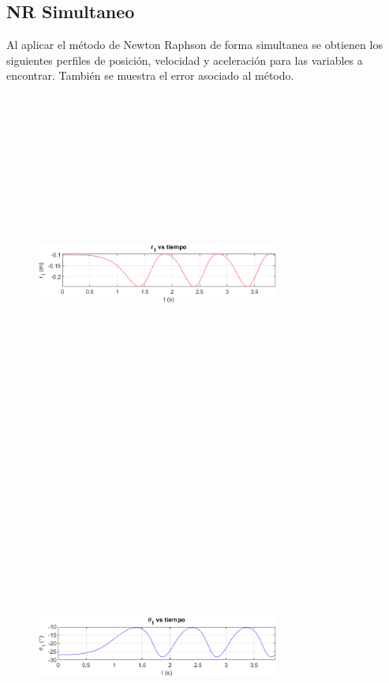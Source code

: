 \documentclass[12pt]{article}
\begin{document}
\subsection{NR Simultaneo}
Al aplicar el método de Newton Raphson de forma simultanea se obtienen los siguientes perfiles de posición, velocidad y aceleración para las variables a encontrar. También se muestra el error asociado al método.
\begin{multicols}{2}
\begin{figure} [H]
        \centerline{\includegraphics[width=8cm, height=12cm,keepaspectratio]{NR Simultaneo/r1.png}}
    \end{figure}
    \vspace{-25pt}
        \begin{figure} [H]
        \centerline{\includegraphics[width=8cm, height=12cm,keepaspectratio]{NR Simultaneo/theta1.png}}

\end{figure}
\end{multicols}
\end{document}
